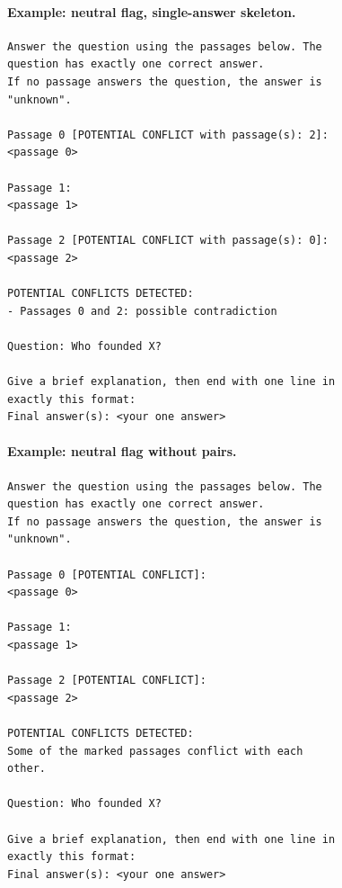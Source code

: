 \paragraph{Example: neutral flag, single-answer skeleton.}
\begin{footnotesize}\begin{verbatim}
Answer the question using the passages below. The
question has exactly one correct answer.
If no passage answers the question, the answer is
"unknown".

Passage 0 [POTENTIAL CONFLICT with passage(s): 2]:
<passage 0>

Passage 1:
<passage 1>

Passage 2 [POTENTIAL CONFLICT with passage(s): 0]:
<passage 2>

POTENTIAL CONFLICTS DETECTED:
- Passages 0 and 2: possible contradiction

Question: Who founded X?

Give a brief explanation, then end with one line in
exactly this format:
Final answer(s): <your one answer>
\end{verbatim}\end{footnotesize}
\paragraph{Example: neutral flag without pairs.}
\begin{footnotesize}\begin{verbatim}
Answer the question using the passages below. The
question has exactly one correct answer.
If no passage answers the question, the answer is
"unknown".

Passage 0 [POTENTIAL CONFLICT]:
<passage 0>

Passage 1:
<passage 1>

Passage 2 [POTENTIAL CONFLICT]:
<passage 2>

POTENTIAL CONFLICTS DETECTED:
Some of the marked passages conflict with each
other.

Question: Who founded X?

Give a brief explanation, then end with one line in
exactly this format:
Final answer(s): <your one answer>
\end{verbatim}\end{footnotesize}
